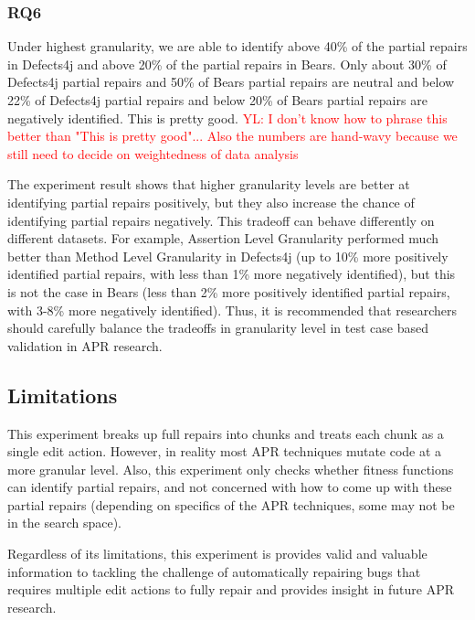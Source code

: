 \documentclass[sigconf, timestamp-false, anonymous=true]{acmart}
\newcommand\todo[1]{\textcolor{red}{#1}}
\begin{document}
\subsubsection{RQ6}

Under highest granularity, we are able to identify above 40\% of the partial repairs in Defects4j
and above 20\% of the partial repairs in Bears. Only about 30\% of Defects4j partial repairs and 50\%
of Bears partial repairs are neutral and below 22\% of Defects4j partial repairs and below 20\% 
of Bears partial repairs are negatively identified. This is pretty good. \todo{YL: I don't know how to phrase this better than
"This is pretty good"... Also the numbers are hand-wavy because we still need to decide on weightedness of data analysis}

The experiment result shows that higher granularity levels are better at identifying partial repairs positively, 
but they also increase the chance of identifying partial repairs negatively.
This tradeoff can behave differently on different datasets. For example,
Assertion Level Granularity performed much better than Method Level Granularity
in Defects4j (up to 10\% more positively identified partial repairs, with less than
1\% more negatively identified), but this is not the case in Bears (less than 2\%
more positively identified partial repairs, with 3-8\% more negatively identified).
Thus, it is recommended that researchers should 
carefully balance the tradeoffs in granularity level in test case based validation
in APR research.


\subsection{Limitations}

This experiment breaks up full repairs into chunks and treats each chunk as a 
single edit action. However, in reality most APR techniques mutate code at 
a more granular level.
Also, this experiment only checks whether fitness functions 
can identify partial repairs, and not concerned with how to come up with these 
partial repairs (depending on specifics of the APR 
techniques, some may not be in the search space).

Regardless of its limitations, this experiment is provides valid and valuable 
information to tackling the challenge of automatically repairing bugs that 
requires multiple edit actions to fully repair 
and provides insight in future APR research.
\end{document}
